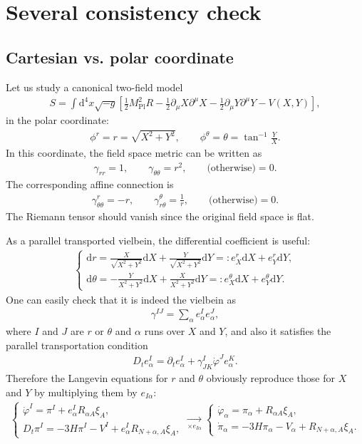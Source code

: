 \documentclass[aps, prd
, preprint
, nofootinbib 
]{revtex4-1}
\newcommand{\dd}{\mathrm{d}}
\newcommand{\Mpl}{M_\text{Pl}}
\newcommand{\bae}[1]{\begin{align} #1 \end{align}}
\newcommand{\bce}[1]{\begin{cases} #1 \end{cases}}
\begin{document}
\section{Several consistency check}

\subsection{Cartesian vs. polar coordinate}

Let us study a canonical two-field model
\bae{
	S=\int\dd^4x\sqrt{-g}\left[\frac{1}{2}\Mpl^2R-\frac{1}{2}\partial_\mu X\partial^\mu X-\frac{1}{2}\partial_\mu Y\partial^\mu Y-V(X,Y)\right],
}
in the polar coordinate:
\bae{
	\phi^r=r=\sqrt{X^2+Y^2}, \quad\quad \phi^\theta=\theta=\tan^{-1}\frac{Y}{X}.
}
In this coordinate, the field space metric can be written as
\bae{
	\gamma_{rr}=1, \quad\quad \gamma_{\theta\theta}=r^2, \quad\quad \text{(otherwise)}=0.
}
The corresponding affine connection is 
\bae{
	\gamma^r_{\theta\theta}=-r, \quad\quad \gamma^\theta_{r\theta}=\frac{1}{r}, \quad\quad \text{(otherwise)}=0.
}
The Riemann tensor should vanish since the original field space is flat.

As a parallel transported vielbein, the differential coefficient is useful:
\bae{
	\bce{
		\displaystyle
		\dd r=\frac{X}{\sqrt{X^2+Y^2}}\dd X+\frac{Y}{\sqrt{X^2+Y^2}}\dd Y=:e^r_X\dd X+e^r_Y\dd Y, \\[10pt]
		\displaystyle
		\dd\theta=-\frac{Y}{X^2+Y^2}\dd X+\frac{X}{X^2+Y^2}\dd Y=:e^\theta_X\dd X+e^\theta_Y\dd Y.
	}
}
One can easily check that it is indeed the vielbein as
\bae{
	\gamma^{IJ}=\sum_\alpha e^I_\alpha e^J_\alpha,
}
where $I$ and $J$ are $r$ or $\theta$ and $\alpha$ runs over $X$ and $Y$, and also it satisfies the parallel transportation condition
\bae{
	D_te^I_\alpha=\partial_te^I_\alpha+\gamma^I_{JK}\dot{\varphi}^Je^K_\alpha.
}
Therefore the Langevin equations for $r$ and $\theta$ obviously reproduce those for $X$ and $Y$ by multiplying them by $e_{I\alpha}$:
\bae{
	\bce{
		\displaystyle
		\dot{\varphi}^I=\pi^I+e^I_\alpha R_{\alpha A}\xi_A, \\
		\displaystyle
		D_t\pi^I=-3H\pi^I-V^I+e^I_\alpha R_{N+\alpha,A}\xi_A,
	}
	\underset{\times e_{I\alpha}}{\to}
	\bce{
		\displaystyle
		\dot{\varphi}_\alpha=\pi_\alpha+R_{\alpha A}\xi_A, \\
		\displaystyle
		\dot{\pi}_\alpha=-3H\pi_\alpha-V_\alpha+R_{N+\alpha,A}\xi_A.
	}
}
\end{document}
